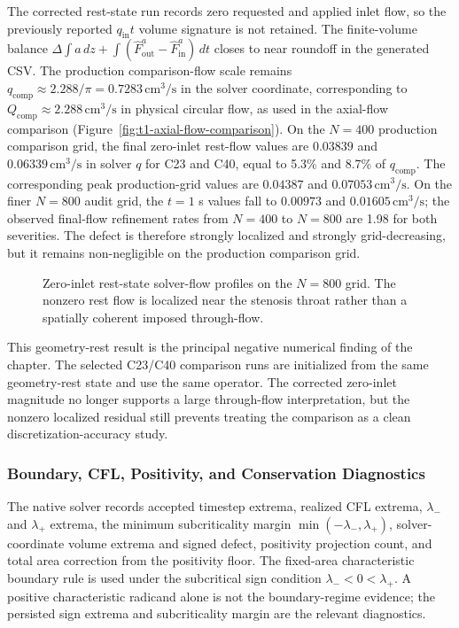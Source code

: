 The corrected rest-state run records zero requested and applied inlet flow, so
the previously reported $q_{\mathrm{in}}t$ volume signature is not retained.
The finite-volume balance
$\Delta\!\int a\,dz+\int(\widehat F^a_{\mathrm{out}}-\widehat F^a_{\mathrm{in}})\,dt$
closes to near roundoff in the generated CSV. The production comparison-flow
scale remains
$q_{\mathrm{comp}}\approx2.288/\pi=0.7283\,\mathrm{cm}^3/\mathrm{s}$ in the
solver coordinate, corresponding to
$Q_{\mathrm{comp}}\approx2.288\,\mathrm{cm}^3/\mathrm{s}$ in physical circular
flow, as used in the axial-flow comparison
(Figure~\ref{fig:t1-axial-flow-comparison}). On the $N=400$ production
comparison grid, the final zero-inlet rest-flow values are $0.03839$ and
$0.06339\,\mathrm{cm}^3/\mathrm{s}$ in solver $q$ for C23 and C40, equal to
5.3\% and 8.7\% of $q_{\mathrm{comp}}$. The corresponding peak production-grid
values are $0.04387$ and $0.07053\,\mathrm{cm}^3/\mathrm{s}$. On the finer
$N=800$ audit grid, the $t=1$ s values fall to $0.00973$ and
$0.01605\,\mathrm{cm}^3/\mathrm{s}$; the observed final-flow refinement rates
from $N=400$ to $N=800$ are 1.98 for both severities. The defect is therefore
strongly localized and strongly grid-decreasing, but it remains non-negligible
on the production comparison grid.

\begin{figure}[!htb]
    \centering
    \caption{Zero-inlet rest-state solver-flow profiles on the $N=800$ grid.
    The nonzero rest flow is localized near the stenosis throat rather than a
    spatially coherent imposed through-flow.}
    \label{fig:rest-state-flow-profiles}
\end{figure}

This geometry-rest result is the principal negative numerical finding of the
chapter. The selected C23/C40 comparison runs are initialized from the same
geometry-rest state and use the same operator. The corrected zero-inlet
magnitude no longer supports a large through-flow interpretation, but the
nonzero localized residual still prevents treating the comparison as a clean
discretization-accuracy study.

\subsubsection{Boundary, CFL, Positivity, and Conservation Diagnostics}
\label{subsec:boundary-diagnostics}

The native solver records accepted timestep extrema, realized CFL extrema,
$\lambda_-$ and $\lambda_+$ extrema, the minimum subcriticality margin
$\min(-\lambda_-,\lambda_+)$, solver-coordinate volume extrema and signed
defect, positivity projection count, and total area correction from the
positivity floor. The fixed-area characteristic boundary rule is used under the
subcritical sign condition $\lambda_-<0<\lambda_+$. A positive characteristic
radicand alone is not the boundary-regime evidence; the persisted sign extrema
and subcriticality margin are the relevant diagnostics.


